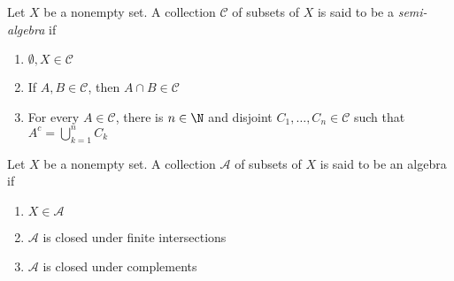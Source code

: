 \begin{definition}
    Let $X$ be a nonempty set. A collection $\mathscr C$ of subsets of $X$ is said to be a \textit{semi-algebra} if 
    \begin{enumerate}[label=(\alph*)]
    \item $\emptyset, X\in\mathscr C$ 
    \item If $A,B\in\mathscr C$, then $A\cap B\in\mathscr C$ 
    \item For every $A\in\mathscr C$, there is $n\in\N$ and disjoint $C_1,\ldots,C_n\in\mathscr C$ such that $A^c = \bigcup\limits_{k = 1}^n C_k$
    \end{enumerate}
\end{definition}

\begin{definition}[Algebra]
    Let $X$ be a nonempty set. A collection $\mathcal A$ of subsets of $X$ is said to be an algebra if 
    \begin{enumerate}[label=(\alph*)]
    \item $X\in\mathcal A$ 
    \item $\mathcal A$ is closed under finite intersections
    \item $\mathcal A$ is closed under complements
    \end{enumerate}
\end{definition}

